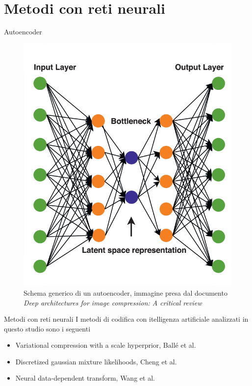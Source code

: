 \section{Metodi con reti neurali}

    \begin{frame}{Autoencoder}
        \begin{figure}[t!]
            \centering
            \includegraphics[width=0.5\textheight]{Immagini/Autoencoder_scheme.png}
            \caption{Schema generico di un autoencoder, immagine presa dal documento \textit{Deep architectures for image compression: A critical review}\footnotemark[1]}
            \label{fig:schemeAutoencoder}
        \end{figure}
    \end{frame}

    \begin{frame}{Metodi con reti neurali}
        I metodi di codifica con itelligenza artificiale analizzati in questo studio sono i seguenti
        \begin{itemize}
            \item Variational compression with a scale hyperprior, Ballé et al\footnotemark[1].
            \item Discretized gaussian mixture likelihoods, Cheng et al\footnotemark[2].
            \item Neural data-dependent transform, Wang et al\footnotemark[3]. 
        \end{itemize}
    \end{frame}

